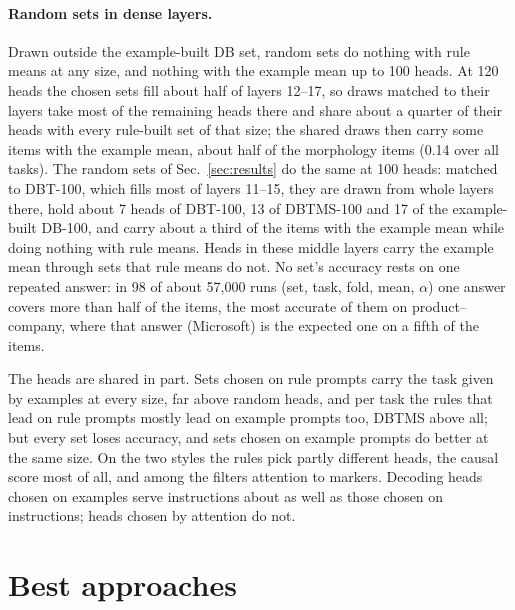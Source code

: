 \documentclass[10pt,a4paper]{article}
\begin{document}
\paragraph{Random sets in dense layers.} Drawn outside the example-built DB set, random sets do nothing with rule means at any size, and nothing with the example mean up to 100 heads. At 120 heads the chosen sets fill about half of layers 12--17, so draws matched to their layers take most of the remaining heads there and share about a quarter of their heads with every rule-built set of that size; the shared draws then carry some items with the example mean, about half of the morphology items (0.14 over all tasks). The random sets of Sec.~\ref{sec:results} do the same at 100 heads: matched to DBT-100, which fills most of layers 11--15, they are drawn from whole layers there, hold about 7 heads of DBT-100, 13 of DBTMS-100 and 17 of the example-built DB-100, and carry about a third of the items with the example mean while doing nothing with rule means. Heads in these middle layers carry the example mean through sets that rule means do not. No set's accuracy rests on one repeated answer: in 98 of about 57{,}000 runs (set, task, fold, mean, $\alpha$) one answer covers more than half of the items, the most accurate of them on product--company, where that answer (Microsoft) is the expected one on a fifth of the items.

The heads are shared in part. Sets chosen on rule prompts carry the task given by examples at every size, far above random heads, and per task the rules that lead on rule prompts mostly lead on example prompts too, DBTMS above all; but every set loses accuracy, and sets chosen on example prompts do better at the same size. On the two styles the rules pick partly different heads, the causal score most of all, and among the filters attention to markers. Decoding heads chosen on examples serve instructions about as well as those chosen on instructions; heads chosen by attention do not.

\section{Best approaches}\label{sec:best}
\end{document}
